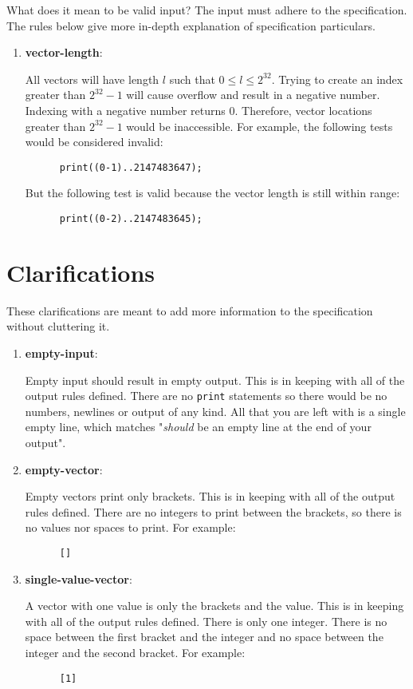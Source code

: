 \documentclass{article}
\newcommand{\code}[1]{\texttt{\textmd{#1}}}
\newcommand{\assertiondest}[1]{\hypertarget{#1}{\textbf{#1}:}}
\newcommand{\clarificationdest}[1]{\hypertarget{#1}{\textbf{#1}:}}
\begin{document}
What does it mean to be valid input? The input must adhere to the specification. The rules below
give more in-depth explanation of specification particulars.
\begin{enumerate}
  \item
    \assertiondest{vector-length}
    All vectors will have length $l$ such that $0 \leq l \leq 2^{32}$. Trying to create an index
    greater than $2^{32} - 1$ will cause overflow and result in a negative number. Indexing with a
    negative number returns $0$. Therefore, vector locations greater than $2^{32} - 1$ would be
    inaccessible. For example, the following tests would be considered invalid:
    \begin{lstlisting}
      print((0-1)..2147483647);
    \end{lstlisting}

    But the following test is valid because the vector length is still within range:
    \begin{lstlisting}
      print((0-2)..2147483645);
    \end{lstlisting}
\end{enumerate}

\section{Clarifications}
These clarifications are meant to add more information to the specification without cluttering it.
\begin{enumerate}
  \item
    \clarificationdest{empty-input}
    Empty input should result in empty output. This is in keeping with all of the output rules
    defined. There are no \code{print} statements so there would be no numbers, newlines or output
    of any kind. All that you are left with is a single empty line, which matches "\textit{should}
    be an empty line at the end of your output".
  \item
    \clarificationdest{empty-vector}
    Empty vectors print only brackets. This is in keeping with all of the output rules defined.
    There are no integers to print between the brackets, so there is no values nor spaces to print.
    For example:
    \begin{lstlisting}
      []
    \end{lstlisting}
  \item
    \clarificationdest{single-value-vector}
    A vector with one value is only the brackets and the value. This is in keeping with all of the
    output rules defined. There is only one integer. There is no space between the first bracket
    and the integer and no space between the integer and the second bracket. For example:
    \begin{lstlisting}
      [1]
    \end{lstlisting}
\end{enumerate}
\end{document}

